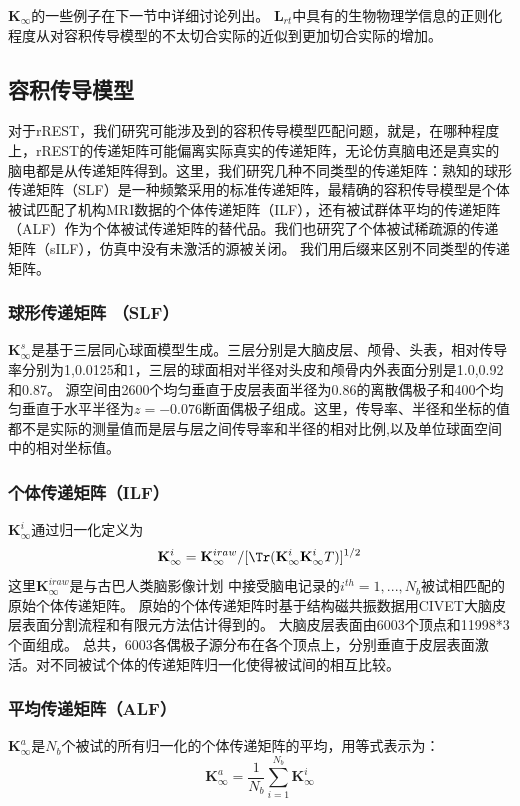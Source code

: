$\mathbf{K}_{\infty}$的一些例子在下一节中详细讨论列出。 $\mathbf{L}_{rt}$中具有的生物物理学信息的正则化程度从对容积传导模型的不太切合实际的近似到更加切合实际的增加。
\subsection{容积传导模型}
对于rREST，我们研究可能涉及到的容积传导模型匹配问题，就是，在哪种程度上，rREST的传递矩阵可能偏离实际真实的传递矩阵，无论仿真脑电还是真实的脑电都是从传递矩阵得到。这里，我们研究几种不同类型的传递矩阵：熟知的球形传递矩阵（SLF）是一种频繁采用的标准传递矩阵，最精确的容积传导模型是个体被试匹配了机构MRI数据的个体传递矩阵（ILF），还有被试群体平均的传递矩阵（ALF）作为个体被试传递矩阵的替代品。我们也研究了个体被试稀疏源的传递矩阵（sILF），仿真中没有未激活的源被关闭。 我们用后缀来区别不同类型的传递矩阵。
\subsubsection{球形传递矩阵 （SLF）}
$\mathbf{K}_{\infty}^{s}$是基于三层同心球面模型生成。三层分别是大脑皮层、颅骨、头表，相对传导率分别为1,0.0125和1，三层的球面相对半径对头皮和颅骨内外表面分别是1.0,0.92和0.87。 源空间由2600个均匀垂直于皮层表面半径为0.86的离散偶极子和400个均匀垂直于水平半径为$z=-0.076$断面偶极子组成。这里，传导率、半径和坐标的值都不是实际的测量值而是层与层之间传导率和半径的相对比例,以及单位球面空间中的相对坐标值。
\subsubsection{个体传递矩阵（ILF）}
$\mathbf{K}_{\infty}^i$通过归一化定义为
\begin{equation*}
\mathbf{K}_{\infty}^i=\mathbf{K}_{\infty}^{iraw}/{[\Tr(\mathbf{K}_{\infty}^i\mathbf{K}_{\infty}^iT)]^{1/{2}}}
\end{equation*}
这里$\mathbf{K}_{\infty}^{iraw}$是与古巴人类脑影像计划
中接受脑电记录的$i^{th}=1,...,N_b$被试相匹配的原始个体传递矩阵。 
原始的个体传递矩阵时基于结构磁共振数据用CIVET大脑皮层表面分割流程和有限元方法估计得到的。 大脑皮层表面由6003个顶点和11998*3个面组成。 总共，6003各偶极子源分布在各个顶点上，分别垂直于皮层表面激活。对不同被试个体的传递矩阵归一化使得被试间的相互比较。

\subsubsection{平均传递矩阵（ALF）}
$\mathbf{K}_{\infty}^a$是$N_b$个被试的所有归一化的个体传递矩阵的平均，用等式表示为：
\begin{equation*}
\mathbf{K}_{\infty}^a=\frac{1}{N_b}\sum_{i=1}^{N_b}\mathbf{K}_{\infty}^i
\end{equation*}

